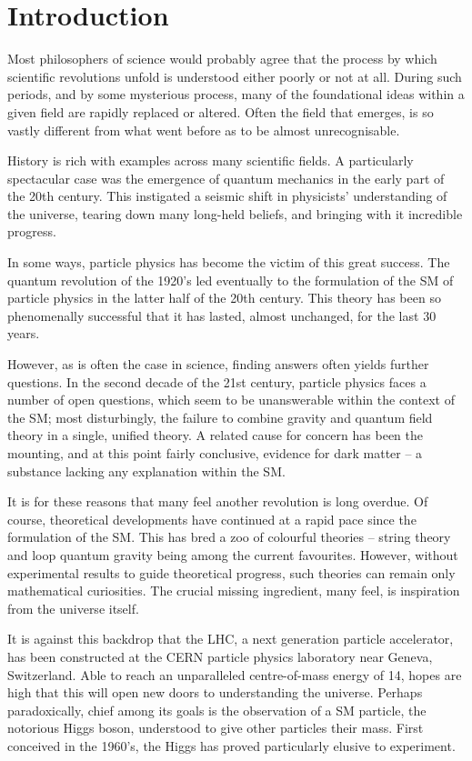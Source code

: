 \chapter*{Introduction}

Most philosophers of science would probably agree that the process by which
scientific revolutions unfold is understood either poorly or not at all. During
such periods, and by some mysterious process, many of the foundational ideas
within a given field are rapidly replaced or altered. Often the field that
emerges, is so vastly different from what went before as to be almost
unrecognisable.

History is rich with examples across many scientific fields. A particularly
spectacular case was the emergence of quantum mechanics in the early part of the
20th century. This instigated a seismic shift in physicists' understanding of
the universe, tearing down many long-held beliefs, and bringing with it
incredible progress.

In some ways, particle physics has become the victim of this great success. The
quantum revolution of the 1920's led eventually to the formulation of the
\acf{SM} of particle physics in the latter half of the 20th century. This theory
has been so phenomenally successful that it has lasted, almost unchanged, for
the last 30 years.

However, as is often the case in science, finding answers often yields further
questions. In the second decade of the 21st century, particle physics faces a
number of open questions, which seem to be unanswerable within the context of
the \ac{SM}; most disturbingly, the failure to combine gravity and quantum field
theory in a single, unified theory. A related cause for concern has been the
mounting, and at this point fairly conclusive, evidence for dark matter -- a
substance lacking any explanation within the \ac{SM}.

It is for these reasons that many feel another revolution is long overdue. Of
course, theoretical developments have continued at a rapid pace since the
formulation of the \ac{SM}. This has bred a zoo of colourful theories -- string
theory and loop quantum gravity being among the current favourites. However,
without experimental results to guide theoretical progress, such theories can
remain only mathematical curiosities. The crucial missing ingredient, many feel,
is inspiration from the universe itself.

It is against this backdrop that the \ac{LHC}, a next generation particle
accelerator, has been constructed at the \ac{CERN} particle physics laboratory
near Geneva, Switzerland. Able to reach an unparalleled centre-of-mass energy of
\unit{14}{\TeV}, hopes are high that this will open new doors to understanding
the universe. Perhaps paradoxically, chief among its goals is the observation of
a \ac{SM} particle, the notorious Higgs boson, understood to give other
particles their mass. First conceived in the 1960's, the Higgs has proved
particularly elusive to experiment.

